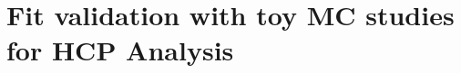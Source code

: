 \documentclass{cmspaper}
\begin{document}
%       
%       
%       
%       

\section{Fit validation with toy MC studies for HCP Analysis}
   \label{sec:appendix_fittoyshcp}
   




\end{document}
